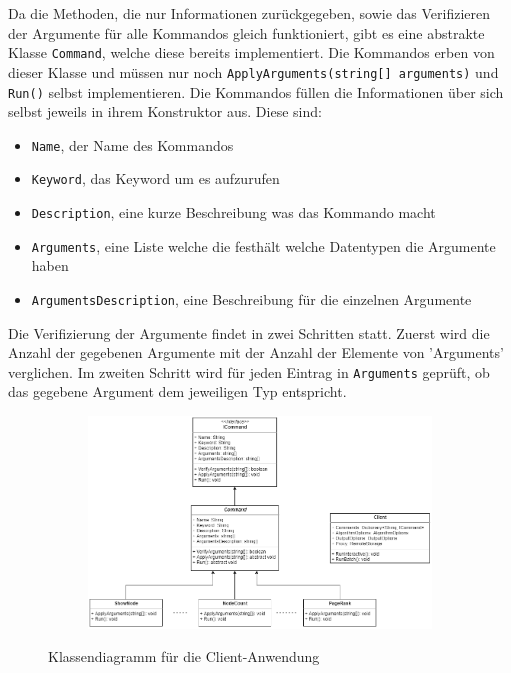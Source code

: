 Da die Methoden, die nur Informationen zurückgegeben, sowie das Verifizieren der Argumente für alle Kommandos gleich funktioniert, gibt es eine abstrakte Klasse
\verb|Command|, welche diese bereits implementiert. Die Kommandos erben von dieser Klasse und müssen nur noch \verb|ApplyArguments(string[] arguments)| und \verb|Run()| selbst implementieren.
Die Kommandos füllen die Informationen über sich selbst jeweils in ihrem Konstruktor aus. Diese sind:

\begin{itemize}
  \item \verb|Name|, der Name des Kommandos
  \item \verb|Keyword|, das Keyword um es aufzurufen
  \item \verb|Description|, eine kurze Beschreibung was das Kommando macht
  \item \verb|Arguments|, eine Liste welche die festhält welche Datentypen die Argumente haben
  \item \verb|ArgumentsDescription|, eine Beschreibung für die einzelnen Argumente
\end{itemize}

Die Verifizierung der Argumente findet in zwei Schritten statt. Zuerst wird die Anzahl der gegebenen Argumente mit der Anzahl der Elemente von 'Arguments' verglichen.
Im zweiten Schritt wird für jeden Eintrag in \verb|Arguments| geprüft, ob das gegebene Argument dem jeweiligen Typ entspricht.


\begin{figure}
  \centering
  \begin{subfigure}[b]{1.0\textwidth}
    \includegraphics[width=1.0\linewidth]{img/client_class.png}
  \end{subfigure}
  \caption{Klassendiagramm für die Client-Anwendung}
  \label{clientClass}
\end{figure}


